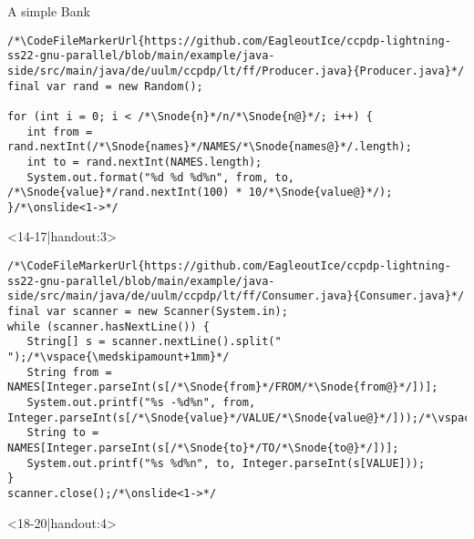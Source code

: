 \begin{frame}[fragile]{A simple Bank}
\begin{onlyenv}
\begin{layout-imageonly}
\begin{onlyenv}
\begin{verbatim}
/*\CodeFileMarkerUrl{https://github.com/EagleoutIce/ccpdp-lightning-ss22-gnu-parallel/blob/main/example/java-side/src/main/java/de/uulm/ccpdp/lt/ff/Producer.java}{Producer.java}*/
final var rand = new Random();

for (int i = 0; i < /*\Snode{n}*/n/*\Snode{n@}*/; i++) {
   int from = rand.nextInt(/*\Snode{names}*/NAMES/*\Snode{names@}*/.length);
   int to = rand.nextInt(NAMES.length);
   System.out.format("%d %d %d%n", from, to, /*\Snode{value}*/rand.nextInt(100) * 10/*\Snode{value@}*/);
}/*\onslide<1->*/
\end{verbatim}
\end{onlyenv}
\begin{onlyenv}<14-17|handout:3>
\begin{verbatim}
/*\CodeFileMarkerUrl{https://github.com/EagleoutIce/ccpdp-lightning-ss22-gnu-parallel/blob/main/example/java-side/src/main/java/de/uulm/ccpdp/lt/ff/Consumer.java}{Consumer.java}*/
final var scanner = new Scanner(System.in);
while (scanner.hasNextLine()) {
   String[] s = scanner.nextLine().split(" ");/*\vspace{\medskipamount+1mm}*/
   String from = NAMES[Integer.parseInt(s[/*\Snode{from}*/FROM/*\Snode{from@}*/])];
   System.out.printf("%s -%d%n", from, Integer.parseInt(s[/*\Snode{value}*/VALUE/*\Snode{value@}*/]));/*\vspace{\medskipamount+1mm}*/
   String to = NAMES[Integer.parseInt(s[/*\Snode{to}*/TO/*\Snode{to@}*/])];
   System.out.printf("%s %d%n", to, Integer.parseInt(s[VALUE]));
}
scanner.close();/*\onslide<1->*/
\end{verbatim}
\end{onlyenv}
\begin{onlyenv}<18-20|handout:4>
\begin{tikzpicture}[@O]

\end{tikzpicture}
\end{onlyenv}
\end{layout-imageonly}
\end{onlyenv}
\end{frame}
